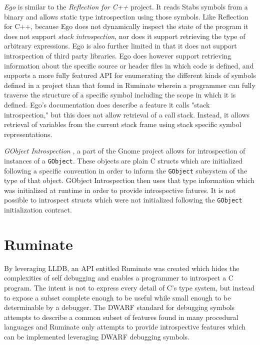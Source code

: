 \documentclass{report}
\begin{document}
\emph{Ego} \autocite{ego, ego-thesis} is similar to the \emph{Reflection for
C++} project. It reads Stabs \autocite{stabs} symbols from a binary and allows
static type introspection using those symbols. Like Reflection for C++, because
Ego does not dynamically inspect the state of the program it does not support
\emph{stack introspection}, nor does it support retrieving the type of arbitrary
expressions. Ego is also further limited in that it does not support
introspection of third party libraries. Ego does however support retrieving
information about the specific source or header files in which code is defined,
and supports a more fully featured API for enumerating the different kinds of
symbols defined in a project than that found in Ruminate wherein a programmer
can fully traverse the structure of a specific symbol including the scope in
which it is defined. Ego's documentation does describe a feature it calls "stack
introspection," but this does not allow retrieval of a call stack. Instead, it
allows retrieval of variables from the current stack frame using stack specific
symbol representations.

\emph{GObject Introspection} \autocite{gobject-introspection}, a part of the
Gnome \autocite{gnome} project allows for introspection of instances of a
\lstinline|GObject|. These objects are plain C structs which are initialized
following a specific convention in order to inform the \lstinline|GObject|
subsystem of the type of that object. GObject Introspection then uses that type
information which was initialized at runtime in order to provide introspective
fatures. It is not possible to introspect structs which were not initialized
following the \lstinline|GObject| initialization contract.

\section{Ruminate}
By leveraging LLDB, an API entitled Ruminate \autocite{ruminate} was created which
hides the complexities of self debugging and enables a programmer to introspect
a C program. The intent is not to express every detail of C's type system, but
instead to expose a subset complete enough to be useful while small enough to be
determinable by a debugger. The DWARF standard for debugging symbols attempts to
describe a common subset of features found in many procedural languages and
Ruminate only attempts to provide introspective features which can be
implemented leveraging DWARF debugging symbols.
\end{document}
